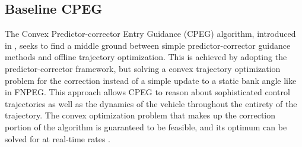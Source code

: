 \subsection{Baseline CPEG}
The Convex Predictor-corrector Entry Guidance (CPEG) algorithm, introduced in \cite{tracy2022}, seeks to find a middle ground between simple predictor-corrector guidance methods and offline trajectory optimization. This is achieved by adopting the predictor-corrector framework, but solving a convex trajectory optimization problem for the correction instead of a simple update to a static bank angle like in FNPEG. This approach allows CPEG to reason about sophisticated control trajectories as well as the dynamics of the vehicle throughout the entirety of the trajectory. The convex optimization problem that makes up the correction portion of the algorithm is guaranteed to be feasible, and its optimum can be solved for at real-time rates \cite{mattingley2012}. 

